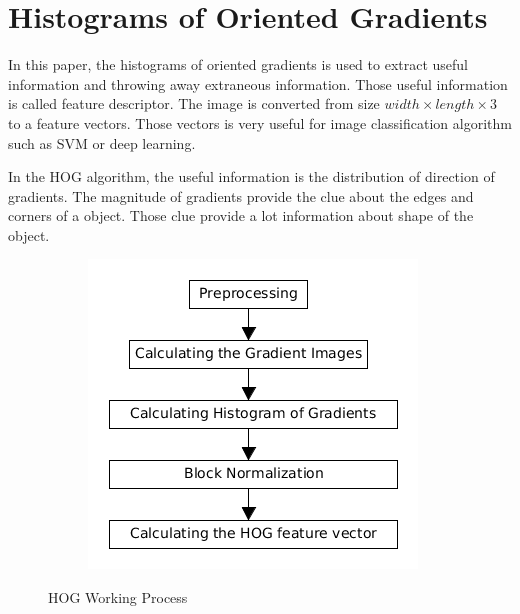 \documentclass[conference]{IEEEtran}
\begin{document}
\section{Histograms of Oriented Gradients}
In this paper, the histograms of oriented gradients is used to extract useful information and throwing away extraneous information.
Those useful information is called feature descriptor. The image is converted from size $width \times length \times 3$ to a feature vectors. Those vectors is very useful for image classification algorithm such as SVM or deep learning.

In the HOG algorithm, the useful information is the distribution of direction of gradients. The magnitude of gradients provide the clue about the edges and corners of a object. Those clue provide a lot information about shape of the object.

\begin{figure}[h]
	\centering
	\begin{subfigure}[t]{0.3\textwidth} 
		\centering
		\includegraphics[scale=0.3]{figures/hog_figure_01.png}
	\end{subfigure}%
	\caption{HOG Working Process}
	\label{HOG_01}
\end{figure}
\end{document}
